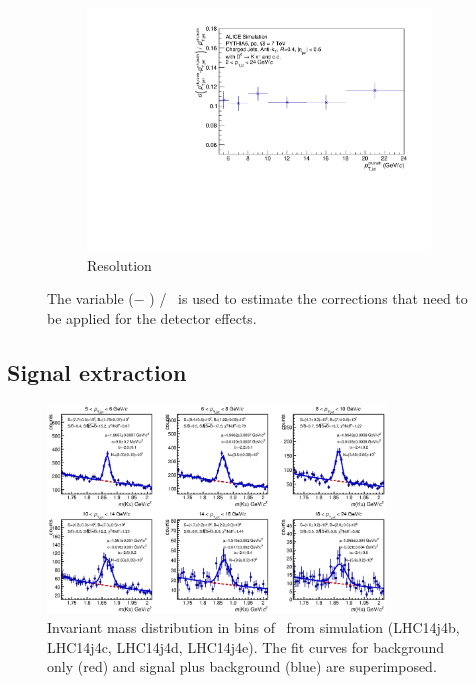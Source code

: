 \begin{figure}[tbh]
\begin{subfigure}{0.49\textwidth}
  \includegraphics[width=1.0\linewidth]{img/HQ16_Simulation_Resolution}
  \caption{Resolution}
  \label{fig:HQ16_Simulation_Resolution}
\end{subfigure}
\caption{The variable (\ptchjetdet $-$ \ptchjetgen) / \ptchjetgen\ is used to estimate the corrections that need to be applied for the detector effects.}
\label{fig:DetectorResponse}
\end{figure}
\subsection{Signal extraction}
\begin{figure}[tbh]
\begin{center}
\includegraphics[width=0.8\textwidth]{img/D0_JetPtBins_PtD_20}
 \caption{Invariant mass distribution in bins of \ptchjetdet\ from simulation (LHC14j4b, LHC14j4c, LHC14j4d, LHC14j4e). The fit curves for background only (red) and signal plus background (blue) are superimposed.} 
 \label{fig:D0_JetPtBins_PtD_20}
\end{center}
\end{figure}

